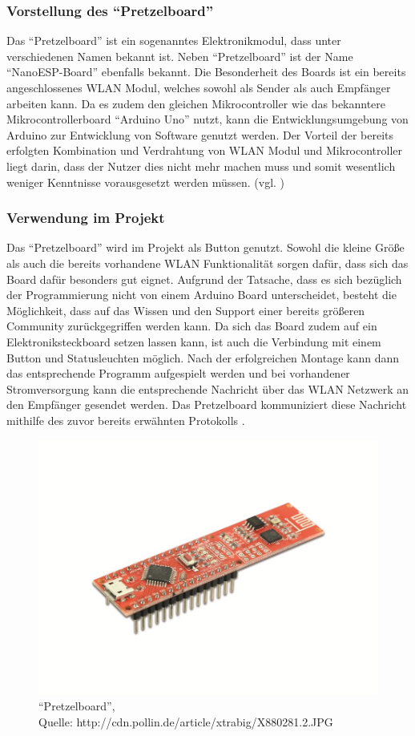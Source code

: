 \subsubsection{Vorstellung des ``Pretzelboard''}        
\label{sec:Vorstellung des ``Pretzelboard''} 
Das ``Pretzelboard'' ist ein sogenanntes Elektronikmodul, dass unter verschiedenen Namen bekannt ist. Neben ``Pretzelboard'' ist der Name ``NanoESP-Board'' ebenfalls bekannt. Die Besonderheit des Boards ist ein bereits angeschlossenes WLAN Modul, welches sowohl als Sender als auch Empfänger arbeiten kann. Da es zudem den gleichen Mikrocontroller wie das bekanntere Mikrocontrollerboard ``Arduino Uno'' nutzt, kann die Entwicklungsumgebung von Arduino zur Entwicklung von Software genutzt werden. 
Der Vorteil der bereits erfolgten Kombination und Verdrahtung von WLAN Modul und Mikrocontroller liegt darin, dass der Nutzer dies nicht mehr machen muss und somit wesentlich weniger Kenntnisse vorausgesetzt werden müssen. (vgl. \cite{.b}\cite{.kafka}\cite{FranzisVerlagGmbH.27.11.2015})


\subsubsection{Verwendung im Projekt}        
\label{sec:Verwendung des ``Pretzelboard''} 
Das ``Pretzelboard'' wird im Projekt als Button genutzt. Sowohl die kleine Größe als auch die bereits vorhandene WLAN Funktionalität sorgen dafür, dass sich das Board dafür besonders gut eignet. Aufgrund der Tatsache, dass es sich bezüglich der Programmierung nicht von einem Arduino Board unterscheidet, besteht die Möglichkeit, dass auf das Wissen und den Support einer bereits größeren Community zurückgegriffen werden kann. 
Da sich das Board zudem auf ein Elektroniksteckboard setzen lassen kann, ist auch die Verbindung mit einem Button und Statusleuchten möglich. Nach der erfolgreichen Montage kann dann das entsprechende Programm aufgespielt werden und bei vorhandener Stromversorgung kann die entsprechende Nachricht über das WLAN Netzwerk an den Empfänger gesendet werden. Das Pretzelboard kommuniziert diese Nachricht mithilfe des zuvor bereits erwähnten Protokolls .

\begin{figure}[!htb]
	\centering
	\includegraphics[scale=0.4]{pretzel.jpg}
	\caption[``Pretzelboard'']{``Pretzelboard'',\\ Quelle: http://cdn.pollin.de/article/xtrabig/X880281.2.JPG}
\end{figure}

\newpage
